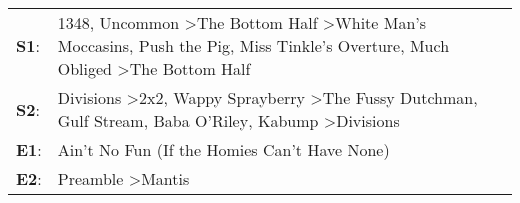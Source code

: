 \begin{supertabular}{p{0.03\textwidth}p{0.92\textwidth}}
 \textbf{S1}:  &  1348\textsuperscript{}, \enspace Uncommon\textsuperscript{} \textgreater \enspace The Bottom Half\textsuperscript{} \textgreater \enspace White Man's Moccasins\textsuperscript{}, \enspace Push the Pig\textsuperscript{}, \enspace Miss Tinkle's Overture\textsuperscript{}, \enspace Much Obliged\textsuperscript{} \textgreater \enspace The Bottom Half\textsuperscript{}  \enspace  \\
 \textbf{S2}:  &                           Divisions\textsuperscript{} \textgreater \enspace 2x2\textsuperscript{}, \enspace Wappy Sprayberry\textsuperscript{} \textgreater \enspace The Fussy Dutchman\textsuperscript{}, \enspace Gulf Stream\textsuperscript{}, \enspace Baba O'Riley\textsuperscript{}, \enspace Kabump\textsuperscript{} \textgreater \enspace Divisions\textsuperscript{}  \enspace  \\
 \textbf{E1}:  &                                                                                                                                                                                                                                                                                                                  Ain't No Fun (If the Homies Can't Have None)\textsuperscript{}  \enspace  \\
 \textbf{E2}:  &                                                                                                                                                                                                                                                                                                       Preamble\textsuperscript{} \textgreater \enspace Mantis\textsuperscript{}  \enspace  \\
\end{supertabular}
